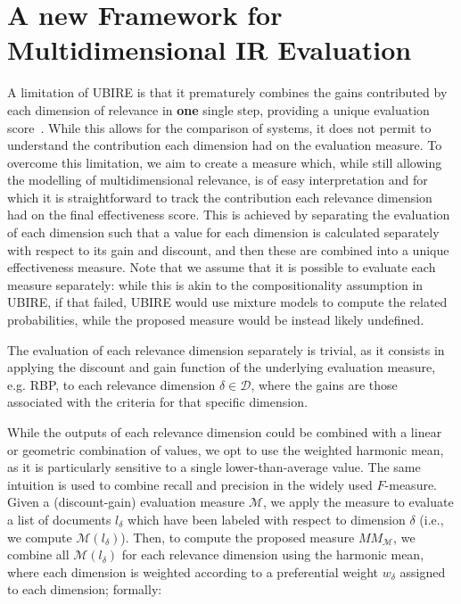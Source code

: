 
\section{A new Framework for Multidimensional IR Evaluation}
\label{sec:extension}

A limitation of UBIRE is that it prematurely combines the gains contributed by each dimension of relevance in \textbf{one} single step, providing a unique evaluation score~\cite{zuccon14,zuccon16}.
While this allows for the comparison of systems, it does not permit to understand the contribution each dimension had on the evaluation measure. 
To overcome this limitation, we aim to create a measure which, while still allowing the modelling of multidimensional relevance, is of easy interpretation and for which it is straightforward to track the contribution each relevance dimension had on the final effectiveness score. This is achieved by separating the evaluation of each dimension such that a value for each dimension is calculated separately with respect to its gain and discount, and then these are combined into a unique effectiveness measure. Note that we assume that it is possible to evaluate each measure separately: while this is akin to the compositionality assumption in UBIRE, if that failed, UBIRE would use mixture models to compute the related probabilities, while the proposed measure would be instead likely undefined. 

The evaluation of each relevance dimension separately is trivial, as it consists in applying the discount and gain function of the underlying evaluation measure, e.g. RBP, to each relevance dimension $\delta \in \mathcal{D}$, where the gains are those associated with the criteria for that specific dimension. 

While the outputs of each relevance dimension could be combined with a linear or geometric combination of values, we opt to use the weighted harmonic mean, as it is particularly sensitive to a single lower-than-average value. The same intuition is used to combine recall and precision in the widely used $F$-measure. 
Given a (discount-gain) evaluation measure $\mathcal{M}$, we apply the measure to evaluate a list of  documents $l_\delta$ which have been labeled with respect to dimension $\delta$ (i.e., we compute $\mathcal{M}(l_\delta)$). Then, to compute the proposed measure $MM_\mathcal{M}$, we combine all $\mathcal{M}(l_\delta)$ for each relevance dimension using the harmonic mean, where each dimension is weighted according to a preferential weight $w_\delta$ assigned to each dimension; formally:

